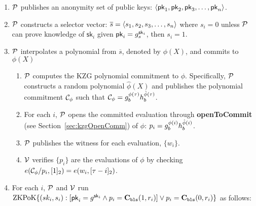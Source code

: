 
\begin{Protocol*}[t!]
    \begin{framed}
    \footnotesize
    \begin{enumerate}
    \item $\mathcal{P}$ publishes an anonymity set of public keys: $\left \langle \mathsf{pk}_1,\mathsf{pk}_2,\mathsf{pk}_3,\dots,\mathsf{pk}_n \right \rangle$.
    \item $\mathcal{P}$ constructs a selector vector: $\overline{s}=\left \langle s_1,s_2,s_3,\ldots,s_n \right \rangle$ where $s_i=0$ unless $\mathcal{P}$ can prove knowledge of $\mathsf{sk}_i$ given $\mathsf{pk}_i=g_s^{\mathsf{sk}_i}$, then  $s_i=1$.
    \item $\mathcal{P}$ interpolates a polynomial from $\overline{s}$, denoted by $\phi(X)$, and commits to $\phi(X)$
    \begin{enumerate}
        \item $\mathcal{P}$ computes the KZG polynomial commitment to $\phi$. Specifically, $\mathcal{P}$ constructs a random polynomial $\hat\phi(X)$ and publishes the polynomial commitment $\mathcal{C}_\phi$ such that $\mathcal{C}_\phi=g_b^{\phi(\tau)}h_b^{\hat\phi(\tau)}$.
        \item For each $i$, $\mathcal{P}$ opens the committed evaluation through \textbf{openToCommit} (see Section~\ref{sec:kzgOpenComm}) of $\phi$: $p_i=g_b^{\phi(i)}h_b^{\hat\phi(i)}$.
        \item $\mathcal{P}$ publishes the witness for each evaluation, $\{w_i\}$.
        \item $\mathcal{V}$ verifies $\{p_i\}$ are the evaluations of $\phi$ by checking $e(\mathcal{C}_\phi/p_i, [1]_2)=e(w_i, [\tau-i]_2)$.
    \end{enumerate}
    \item For each $i$, $\mathcal{P}$ and $\mathcal{V}$ run $\mathrm{ZKPoK} \{ (sk_i,s_i) :  [\mathsf{pk}_i=g^{\mathsf{sk}_i} \land p_i=\textbf{C}_\texttt{bls}(1,r_i)  ] \lor p_i=\textbf{C}_\texttt{bls}(0,r_i) \}$ as follows:
    

\end{enumerate}
\end{framed}
\end{Protocol*}

